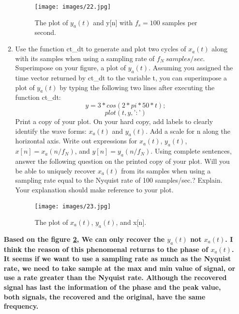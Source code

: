 \documentclass[12pt]{article}
\begin{document}
\begin{enumerate}
\begin{enumerate}
\begin{figure}[H]
    \centering
    \begin{minipage}[b]{0.7\textwidth}
        \texttt{[image: images/22.jpg]}
    \end{minipage}
    \caption{The plot of $y_a(t)$ and y[n] with $f_s = 100$ samples per second.}
    \label{fig:22}
\end{figure}







\item Use the function ct\_dt to generate and plot two cycles of $x_a(t)$ along with its samples when using a sampling rate of $f_N\ samples/sec$. Superimpose on your figure, a plot of $y_a(t)$. Assuming you assigned the time vector returned by ct\_dt to the variable t, you can superimpose a plot of $y_a(t)$ by typing the following two lines after executing the function ct\_dt:
$$
y = 3*cos(2*pi*50*t);
$$
$$
plot(t,y,’:’)
$$
Print a copy of your plot. On your hard copy, add labels to clearly identify the wave forms: $x_a(t)$ and $y_a(t)$. Add a scale for n along the horizontal axis. Write out expressions for
$x_a(t)$, $y_a(t)$, $x[n] = x_a(n/f_N)$, and $y[n] = y_a(n/f_N)$. Using complete sentences, answer the following question on the printed copy of your plot. Will you be able to uniquely recover $x_a(t)$ from its samples when using a sampling rate equal to the Nyquist rate of 100 samples/sec.? Explain. Your explanation should make reference to your plot.



\begin{figure}[H]
    \centering
    \begin{minipage}[b]{0.7\textwidth}
        \texttt{[image: images/23.jpg]}
    \end{minipage}
    \caption{The plot of $x_a(t)$, $y_a(t)$, and x[n].}
    \label{fig:23}
\end{figure}

\end{enumerate}

\textbf{Based on the figure \ref{fig:23}, We can only recover the $y_a(t)$ not $x_a(t)$. I think the reason of this phenomenal returns to the phase of $x_a(t)$. It seems if we want to use a sampling rate as much as the Nyquist rate, we need to take sample at the max and min value of signal, or use a rate greater than the Nyquist rate. Although the recovered signal has last the information of the phase and the peak value, both signals, the recovered and the original, have the same frequency.}



\end{enumerate}
\end{document}
